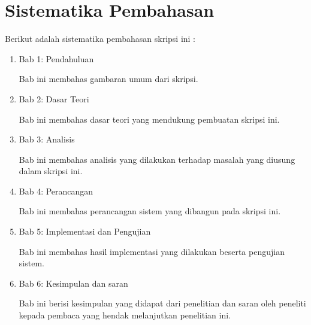 \section{Sistematika Pembahasan}
\label{sec:sispem}
Berikut adalah sistematika pembahasan skripsi ini :
\begin{enumerate}
\item Bab 1: Pendahuluan

Bab ini membahas gambaran umum dari skripsi.

\item Bab 2: Dasar Teori

Bab ini membahas dasar teori yang mendukung pembuatan skripsi ini.

\item Bab 3: Analisis

Bab ini membahas analisis yang dilakukan terhadap masalah yang diusung dalam skripsi ini.

\item Bab 4: Perancangan

Bab ini membahas perancangan sistem yang dibangun pada skripsi ini.

\item Bab 5: Implementasi dan Pengujian

Bab ini membahas hasil implementasi yang dilakukan beserta pengujian sistem.

\item Bab 6: Kesimpulan dan saran

Bab ini berisi kesimpulan yang didapat dari penelitian dan saran oleh peneliti kepada pembaca yang hendak melanjutkan penelitian ini. 

\end{enumerate}